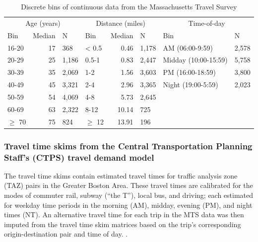 \documentclass[numbered]{trbunofficial}\usepackage[]{graphicx}\usepackage[]{color}
\begin{document}
\begin{table}[!h]
\centering
\caption{Discrete bins of continuous data from the Massachusetts Travel Survey}
\label{tab:contdata}
\begingroup\fontsize{9}{11}\selectfont

\begin{tabular}{lrllrlll}
\toprule
\multicolumn{3}{c}{Age (years)} & \multicolumn{3}{c}{Distance (miles)} & \multicolumn{2}{c}{Time-of-day} \\
\cmidrule(l{3pt}r{3pt}){1-3} \cmidrule(l{3pt}r{3pt}){4-6} \cmidrule(l{3pt}r{3pt}){7-8}
Bin & Median & N & Bin & Median & N & Bin & N\\
\midrule
16-20 & 17 & 368 & < 0.5 & 0.46 & 1,178 & AM (06:00-9:59) & 2,578\\
20-29 & 25 & 1,186 & 0.5-1 & 0.83 & 2,447 & Midday (10:00-15:59) & 5,758\\
30-39 & 35 & 2,069 & 1-2 & 1.56 & 3,603 & PM (16:00-18:59) & 3,800\\
40-49 & 45 & 3,321 & 2-4 & 2.96 & 3,365 & Night (19:00-5:59) & 2,023\\
50-59 & 54 & 4,069 & 4-8 & 5.73 & 2,645 &  & \\
60-69 & 63 & 2,322 & 8-12 & 10.14 & 725 &  & \\
$\geq$ 70 & 75 & 824 & $\geq$ 12 & 13.91 & 196 &  & \\
\bottomrule
\end{tabular}
\endgroup{}


\end{table}

\subsubsection{Travel time skims from the Central Transportation Planning Staff's (CTPS) travel demand model}
The travel time skims contain estimated travel times for  traffic analysis zone (TAZ) pairs in the Greater Boston Area. These travel times are calibrated for the modes of commuter rail, subway (``the T''), local bus, and driving; each estimated for weekday time periods in the morning (AM), midday, evening (PM), and night times (NT). An alternative travel time for each trip in the MTS data was then imputed from the travel time skim matrices based on the trip's corresponding origin-destination pair and time of day.
.
\end{document}
